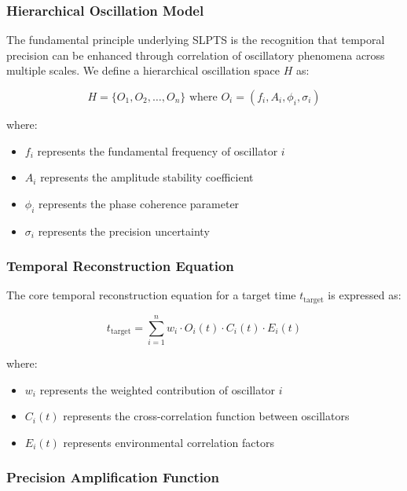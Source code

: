 \documentclass[12pt,a4paper]{article}
\begin{document}
{{{{{{{{{{{{{{\subsubsection{Hierarchical Oscillation Model}

The fundamental principle underlying SLPTS is the recognition that temporal precision can be enhanced through correlation of oscillatory phenomena across multiple scales. We define a hierarchical oscillation space $H$ as:

\begin{equation}
H = \{O_1, O_2, \ldots, O_n\} \text{ where } O_i = (f_i, A_i, \phi_i, \sigma_i)
\end{equation}

where:
\begin{itemize}
\item $f_i$ represents the fundamental frequency of oscillator $i$
\item $A_i$ represents the amplitude stability coefficient
\item $\phi_i$ represents the phase coherence parameter
\item $\sigma_i$ represents the precision uncertainty
\end{itemize}

\subsubsection{Temporal Reconstruction Equation}

The core temporal reconstruction equation for a target time $t_{\text{target}}$ is expressed as:

\begin{equation}
t_{\text{target}} = \sum_{i=1}^{n} w_i \cdot O_i(t) \cdot C_i(t) \cdot E_i(t)
\end{equation}

where:
\begin{itemize}
\item $w_i$ represents the weighted contribution of oscillator $i$
\item $C_i(t)$ represents the cross-correlation function between oscillators
\item $E_i(t)$ represents environmental correlation factors
\end{itemize}

\subsubsection{Precision Amplification Function}

}}}}}}}}}}}}}}
\end{document}
